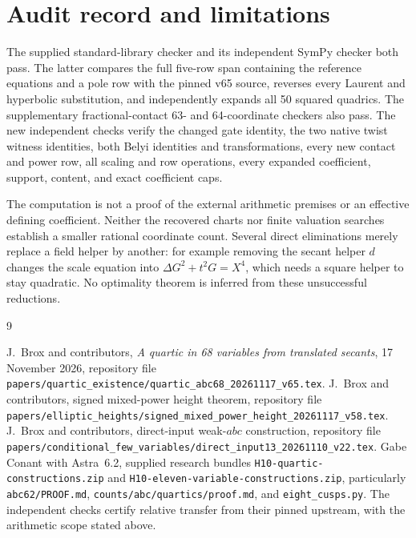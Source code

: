 \documentclass[11pt,a4paper]{article}
\begin{document}
\section{Audit record and limitations}
The supplied standard-library checker and its independent SymPy checker
both pass. The latter compares the full five-row span containing the
reference equations and a pole row with the pinned v65 source, reverses
every Laurent and hyperbolic substitution, and independently expands
all 50 squared quadrics. The supplementary fractional-contact 63- and
64-coordinate checkers also pass. The new independent checks verify the
changed gate identity, the two native twist witness identities, both
Belyi identities and transformations, every new contact and power row,
all scaling and row operations, every expanded coefficient, support,
content, and exact coefficient caps.

The computation is not a proof of the external arithmetic premises or
an effective defining coefficient. Neither the recovered charts nor
finite valuation searches establish a smaller rational coordinate count.
Several direct eliminations merely replace a field helper by another:
for example removing the secant helper $d$ changes the scale equation
into $\Delta G^2+t^2G=X^4$, which needs a square helper to stay quadratic.
No optimality theorem is inferred from these unsuccessful reductions.

\begin{thebibliography}{9}\raggedright
{} J.~Brox and contributors, \emph{A quartic in 68 variables from
translated secants}, 17 November 2026, repository file
\nolinkurl{papers/quartic_existence/quartic_abc68_20261117_v65.tex}.
 J.~Brox and contributors, signed mixed-power height theorem,
repository file
\nolinkurl{papers/elliptic_heights/signed_mixed_power_height_20261117_v58.tex}.
 J.~Brox and contributors, direct-input weak-$abc$ construction,
repository file
\nolinkurl{papers/conditional_few_variables/direct_input13_20261110_v22.tex}.
 Gabe Conant with Astra~6.2, supplied research bundles
\texttt{H10-quartic-constructions.zip} and
\texttt{H10-eleven-variable-constructions.zip}, particularly
\texttt{abc62/PROOF.md}, \texttt{counts/abc/quartics/proof.md}, and
\texttt{eight\_cusps.py}. The independent checks certify relative
transfer from their pinned upstream, with the arithmetic scope stated above.
\end{thebibliography}
\end{document}
